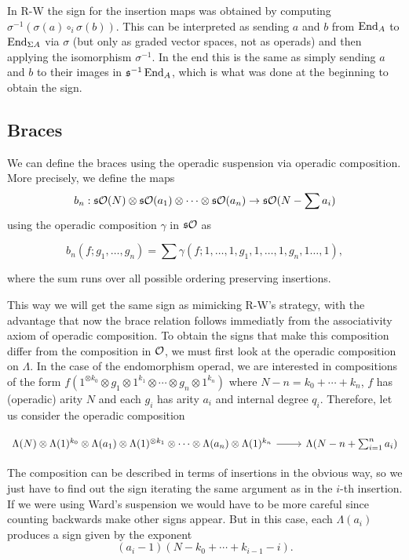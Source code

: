 \documentclass[twoside]{article}
\begin{document}
In R-W the sign for the insertion maps was obtained by computing $\sigma^{-1}(\sigma(a)\circ_i\sigma(b))$. This can be interpreted as sending $a$ and $b$ from $\operatorname{End}_A$ to $\operatorname{End}_{\Sigma A}$ via $\sigma$ (but only as graded vector spaces, not as operads) and then applying the isomorphism $\sigma^{-1}$. In the end this is the same as simply sending $a$ and $b$ to their images in $\mathfrak{s}^{-1}\operatorname{End}_A$, which is what was done at the beginning to obtain the sign.
\subsection{Braces}
We can define the braces using the operadic suspension via operadic composition. More precisely, we define the maps 
$$b_n:\mathfrak{s}{\mathcal O}(N)\otimes\mathfrak{s}{\mathcal O}(a_1)\otimes\cdots\otimes\mathfrak{s}{\mathcal O}(a_n)\to\mathfrak{s}{\mathcal O}(N-\sum a_i)$$
using the operadic composition $\gamma$ in $\mathfrak{s}{\mathcal O}$ as

$$b_n(f;g_1,\dots,g_n)=\sum\gamma(f;1,\dots,1,g_1,1,\dots,1,g_n,1\dots,1),$$

where the sum runs over all possible ordering preserving insertions. 

 This way we will get the same sign as mimicking R-W's strategy, with the advantage that now the brace relation follows immediatly from the associativity axiom of operadic composition. To obtain the signs that make this composition differ from the composition in ${\mathcal O}$, we must first look at the operadic composition on $\Lambda$. In the case of the endomorphism operad, we are interested in compositions of the form $f(1^{\otimes k_0}\otimes g_1\otimes 1^{k_1}\otimes\cdots\otimes g_n\otimes 1^{k_n})$ where $N-n=k_0+\cdots+k_n$, $f$ has (operadic) arity $N$ and each $g_i$ has arity $a_i$ and internal degree $q_i$. Therefore, let us consider the operadic composition

\[
\begin{tikzcd}
\Lambda(N)\otimes\Lambda(1)^{k_0}\otimes\Lambda(a_1)\otimes\Lambda(1)^{\otimes k_1}\otimes\cdots\otimes\Lambda(a_n)\otimes\Lambda(1)^{k_n}\arrow[r] & \Lambda(N-n+\sum_{i=1}^na_i)
\end{tikzcd}
\]

The composition can be described in terms of insertions in the obvious way, so we just have to find out the sign iterating the same argument as in the $i$-th insertion. If we were using Ward's suspension we would have to be more careful since counting backwards make other signs appear. But in this case, each $\Lambda(a_i)$ produces a sign given by the exponent $$(a_i-1)(N-k_0+\cdots+k_{i-1}-i).$$ 
\end{document}
